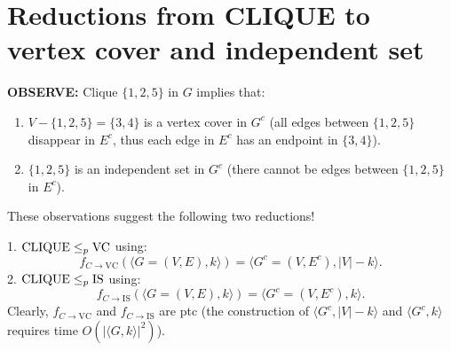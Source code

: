 \section{Reductions from CLIQUE to vertex cover and independent set}
\textbf{OBSERVE:} Clique $\{1,2,5\}$ in $G$ implies that:
\begin{enumerate}
\item $V-\{1,2,5\}=\{3,4\}$ is a vertex cover in $G^c$ (all edges between $\{1,2,5\}$ disappear in $E^c$, thus each edge in $E^c$ has an endpoint in $\{3,4\}$).
\item $\{1,2,5\}$ is an independent set in $G^c$ (there cannot be edges between $\{1,2,5\}$ in $E^c$).
\end{enumerate}
These observations suggest the following two reductions!

1. $\mathrm{CLIQUE}\leq_p\mathrm{VC}$ using:
\[f_{C\to\mathrm{VC}}(\langle G=(V,E),k\rangle)=\langle G^c=(V,E^c),|V|-k\rangle.\]
2. $\mathrm{CLIQUE}\leq_p\mathrm{IS}$ using:
\[f_{C\to\mathrm{IS}}(\langle G=(V,E),k\rangle)=\langle G^c=(V,E^c),k\rangle.\]
Clearly, $f_{C\to\mathrm{VC}}$ and $f_{C\to\mathrm{IS}}$ are ptc (the construction of $\langle G^c,|V|-k\rangle$ and $\langle G^c,k\rangle$ requires time $O(|\langle G,k\rangle|^2)$).

